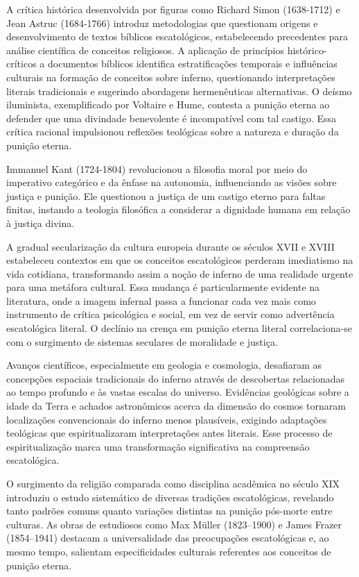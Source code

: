 A crítica histórica desenvolvida por figuras como Richard Simon (1638-1712) e Jean Astruc (1684-1766) introduz metodologias que questionam origens e desenvolvimento de textos bíblicos escatológicos, estabelecendo precedentes para análise científica de conceitos religiosos. A aplicação de princípios histórico-críticos a documentos bíblicos identifica estratificações temporais e influências culturais na formação de conceitos sobre inferno, questionando interpretações literais tradicionais e sugerindo abordagens hermenêuticas alternativas. O deísmo iluminista, exemplificado por Voltaire e Hume, contesta a punição eterna ao defender que uma divindade benevolente é incompatível com tal castigo. Essa crítica racional impulsionou reflexões teológicas sobre a natureza e duração da punição eterna.

Immanuel Kant (1724-1804) revolucionou a filosofia moral por meio do imperativo categórico e da ênfase na autonomia, influenciando as visões sobre justiça e punição. Ele questionou a justiça de um castigo eterno para faltas finitas, instando a teologia filosófica a considerar a dignidade humana em relação à justiça divina.

A gradual secularização da cultura europeia durante os séculos XVII e XVIII estabeleceu contextos em que os conceitos escatológicos perderam imediatismo na vida cotidiana, transformando assim a noção de inferno de uma realidade urgente para uma metáfora cultural. Essa mudança é particularmente evidente na literatura, onde a imagem infernal passa a funcionar cada vez mais como instrumento de crítica psicológica e social, em vez de servir como advertência escatológica literal. O declínio na crença em punição eterna literal correlaciona-se com o surgimento de sistemas seculares de moralidade e justiça.

Avanços científicos, especialmente em geologia e cosmologia, desafiaram as concepções espaciais tradicionais do inferno através de descobertas relacionadas ao tempo profundo e às vastas escalas do universo. Evidências geológicas sobre a idade da Terra e achados astronômicos acerca da dimensão do cosmos tornaram localizações convencionais do inferno menos plausíveis, exigindo adaptações teológicas que espiritualizaram interpretações antes literais. Esse processo de espiritualização marca uma transformação significativa na compreensão escatológica.

O surgimento da religião comparada como disciplina acadêmica no século XIX introduziu o estudo sistemático de diversas tradições escatológicas, revelando tanto padrões comuns quanto variações distintas na punição pós-morte entre culturas. As obras de estudiosos como Max Müller (1823--1900) e James Frazer (1854--1941) destacam a universalidade das preocupações escatológicas e, ao mesmo tempo, salientam especificidades culturais referentes aos conceitos de punição eterna.


